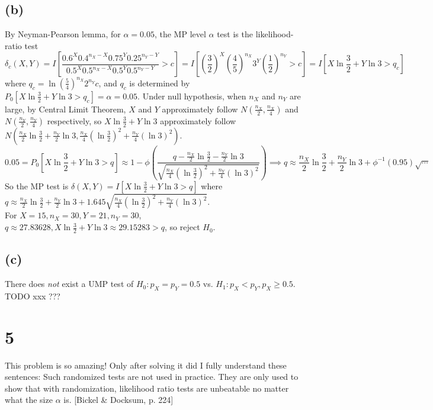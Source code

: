 \subsection*{(b)}
By Neyman-Pearson lemma, for $\alpha=0.05$, the MP level $\alpha$ test is the likelihood-ratio test
$$
\delta_c(X, Y) =
I\left[
\frac{0.6^{X}0.4^{n_X-X}0.75^{Y}0.25^{n_Y-Y}}
{0.5^{X}0.5^{n_X-X}0.5^{Y}0.5^{n_Y-Y}}
> c \right]
=
I\left[
(\frac{3}{2})^{X}(\frac{4}{5})^{n_X}3^{Y}(\frac{1}{2})^{n_Y}
> c \right]
=
I\left[
X\ln\frac{3}{2} + Y\ln3 > q_c
\right]
$$
where $q_c = \ln (\frac{5}{4})^{n_X} 2^{n_Y} c$, and $q_c$ is determined by
$
P_0 \left[
X\ln\frac{3}{2} + Y\ln3
> q_c
\right] = \alpha = 0.05
$.
Under null hypothesis, when $n_X$ and $n_Y$ are large, by Central Limit Theorem, $X$ and $Y$ approximately follow $N(\frac{n_X}{2}, \frac{n_X}{4})$ and $N(\frac{n_Y}{2}, \frac{n_Y}{4})$ respectively, so
$
X\ln\frac{3}{2} + Y\ln3
$
approximately follow
$
N(\frac{n_X}{2} \ln \frac{3}{2}+\frac{n_Y}{2}\ln3,
\frac{n_X}{4}(\ln\frac{3}{2})^2 + \frac{n_Y}{4}(\ln 3)^2)
$.
$$
0.05 = P_0 \left[
X\ln\frac{3}{2} + Y\ln3
> q
\right] \approx
1-
\phi\left(\frac{q-\frac{n_X}{2} \ln \frac{3}{2}-\frac{n_Y}{2}\ln3}
{\sqrt{\frac{n_X}{4}(\ln\frac{3}{2})^2 + \frac{n_Y}{4}(\ln 3)^2}}
\right)
\implies
q \approx 
\frac{n_X}{2} \ln \frac{3}{2}+\frac{n_Y}{2}\ln3+
\phi^{-1}(0.95)
\sqrt{\cdots}
$$
So the MP test is
$
\delta(X, Y) =
I\left[
X\ln\frac{3}{2} + Y\ln3 > q
\right]
$
where
$
q \approx 
\frac{n_X}{2} \ln \frac{3}{2}+\frac{n_Y}{2}\ln3+
1.645
{\sqrt{\frac{n_X}{4}(\ln\frac{3}{2})^2 + \frac{n_Y}{4}(\ln 3)^2}}
$. \\
For $X=15, n_X=30, Y=21, n_Y=30$,
$q \approx 27.83628, X\ln\frac{3}{2}+Y\ln3 \approx 29.15283 > q$, so reject $H_0$.

\subsection*{(c)}
There does \emph{not} exist a UMP test of
$H_0: p_X=p_Y=0.5$
vs.
$H_1: p_X<p_Y, p_X \geq 0.5$.
TODO xxx ???

\section*{5}
This problem is so amazing! Only after solving it did I fully understand these sentences: Such randomized tests are not used in practice. They are only used to show that with randomization, likelihood ratio tests are unbeatable no matter what the size $\alpha$ is. [Bickel \& Docksum, p. 224]
